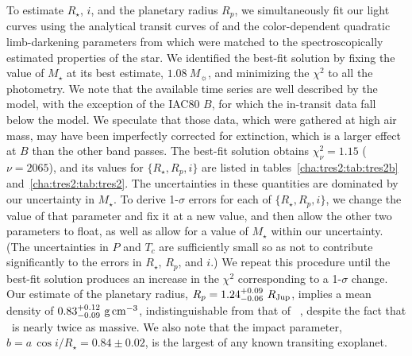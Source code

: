 To estimate $R_{\star}$, $i$, and the planetary radius $R_{p}$, we
simultaneously fit our light curves using the analytical transit
curves of \citet{Mandel_Agol:apjl:2002a} and the color-dependent
quadratic limb-darkening parameters from \citet{Claret:aa:2000a} which
were matched to the spectroscopically estimated properties of the
star.  We identified the best-fit solution by fixing the value of
$M_{\star}$ at its best estimate, $1.08\ M_{\sun}$, and minimizing the
${\chi}^2$ to all the photometry.  We note that the available time
series are well described by the model, with the exception of the
IAC80 $B$, for which the in-transit data fall below the model.  We
speculate that those data, which were gathered at high air mass, may
have been imperfectly corrected for extinction, which is a larger
effect at $B$ than the other band passes.  The best-fit solution
obtains ${\chi}_{\nu}^2=1.15$ ($\nu=2065$), and
its values for $\{R_{\star}, R_{p},i\}$ are listed in tables~\ref{cha:tres2:tab:tres2b}
and~\ref{cha:tres2:tab:tres2}. The
uncertainties in these quantities are dominated by our uncertainty in
$M_{\star}$. To derive 1-$\sigma$ errors for each of $\{R_{\star},
R_{p}, i\}$, we change the value of that parameter and fix it at a new
value, and then allow the other two parameters to float, as well as
allow for a value of $M_{\star}$ within our uncertainty. (The uncertainties in
$P$ and $T_{c}$ are sufficiently small so as not to contribute significantly
to the errors in $R_{\star}$, $R_{p}$, and $i$.) We repeat
this procedure until the best-fit solution produces an increase in the
${\chi}^2$ corresponding to a 1-$\sigma$ change.  Our estimate of the
planetary radius, $R_{p} = 1.24^{+0.09}_{-0.06}\ R_{\rm Jup}$, implies
a mean density of $0.83^{+0.12}_{-0.09} \ {\rm g\, cm^{-3}}$,
indistinguishable from that of \tresOne\ \citep[using the values
  from][]{Sozzetti_Yong_Torres:apjl:2004a}, despite the fact that
\tresTwo\ is nearly twice as massive. We also note that the impact
parameter, $b = a\, \cos{i} / R_{\star} = 0.84\pm0.02$, is the largest of any
known transiting exoplanet.

